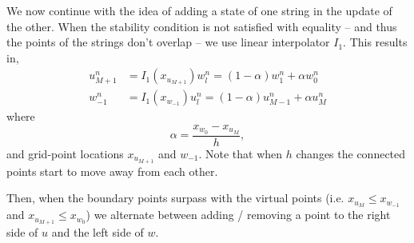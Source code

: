\documentclass[dvipsnames]{article}
\begin{document}
We now continue with the idea of adding a state of one string in the update of the other. When the stability condition is not satisfied with equality -- and thus the points of the strings don't overlap -- we use linear interpolator $I_1$. This results in,
\begin{align}
    u_{M+1}^n &= I_1(x_{u_{M+1}})w_l^n = (1-\alpha)w_1^n + \alpha w_0^n\\
    w_{-1}^n &= I_1(x_{w_{-1}})u_l^n = (1-\alpha)u_{M-1}^n + \alpha u_M^n
\end{align}
where
\begin{equation}
    \alpha = \frac{x_{w_0} - x_{u_M}}{h},
\end{equation}
and grid-point locations $x_{u_{M+1}}$ and $w_{-1}$. Note that when $h$ changes the connected points start to move away from each other.
\begin{figure}[h]
    \centering
    \caption{}\label{fig:interpolated}
\end{figure}
%
Then, when the boundary points surpass with the virtual points (i.e. $x_{u_M} \leq x_{w_{-1}}$ and $x_{u_{M+1}} \leq x_{w_0}$) we alternate between adding / removing a point to the right side of $u$ and the left side of $w$.
\end{document}
